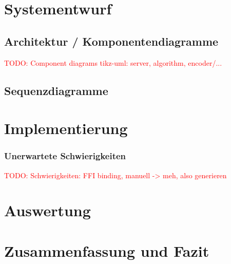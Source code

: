 \documentclass[
	12pt,
	table,
	bigheadings,
	ngerman,
	a4paper,
	BCOR5mm,
	DIV14,
	1.1headlines,
	pagesize,
	oneside,
	openright,
	titlepage,
	headsepline,
	nochapterprefix,
	bibtotoc,
	tocindent,
	listsindent,
	pointlessnumbers,
	cleardoubleempty,
	fleqn,
	halfparskip
]{scrbook}
\newcommand{\todo}[1]{\textcolor{red}{TODO: #1}}
\begin{document}
	
	\setcounter{page}{0}
	
	
	
	
	
	
	
	\thispagestyle{empty}
	
	
	\clearpage	
	\hypersetup{allcolors=black}
	\tableofcontents
	\hypersetup{allcolors=blue}
	\newpage
	
	
	\setcounter{page}{1}
	
	
	
	
		
	
	
	
	
	
	
	
		
	\chapter{Systementwurf}
		\section{Architektur / Komponentendiagramme}
		\todo{Component diagrams tikz-uml: server, algorithm, encoder/...}		
		
		\section{Sequenzdiagramme}
	
	\chapter{Implementierung}
		\subsection{Unerwartete Schwierigkeiten}
			\todo{Schwierigkeiten: FFI binding, manuell -> meh, also generieren}
			
	\chapter{Auswertung}
	
	\chapter{Zusammenfassung und Fazit}
	
	
	
	
	\clearpage
	\printbibliography
	
	\clearpage
	\printglossary[type=\acronymtype]

	\clearpage
	\listoffigures
	\lstlistoflistings
	
	
\end{document}
